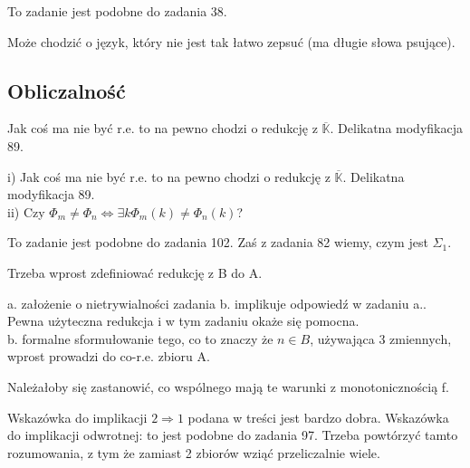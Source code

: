 \documentclass[a4paper,11pt]{article}
\newenvironment{zadanie}[1]
  {\renewcommand\theinnercustomthm{#1}\innercustomthm}
  {\endinnercustomthm}
\begin{document}
\begin{zadanie}{75}
To zadanie jest podobne do zadania 38.
\end{zadanie}

\begin{zadanie}{76}
Może chodzić o język, który nie jest tak łatwo zepsuć (ma długie słowa psujące).
\end{zadanie}

\subsection{Obliczalność}

\begin{zadanie}{92}
Jak coś ma nie być r.e. to na pewno chodzi o redukcję z $\overline{\mathbb{K}}$. Delikatna modyfikacja 89.
\end{zadanie}

\begin{zadanie}{99}
i) Jak coś ma nie być r.e. to na pewno chodzi o redukcję z $\overline{\mathbb{K}}$. Delikatna modyfikacja 89. \\
ii) Czy $\Phi_m \neq \Phi_n \Longleftrightarrow \exists k \Phi_m(k) \neq \Phi_n(k)$?
\end{zadanie}

\begin{zadanie}{100}
To zadanie jest podobne do zadania 102. Zaś z zadania 82 wiemy, czym jest $\Sigma_1$.
\end{zadanie}

\begin{zadanie}{101}
Trzeba wprost zdefiniować redukcję z B do A. 
\end{zadanie}

\begin{zadanie}{102}
a. założenie o nietrywialności zadania b. implikuje odpowiedź w zadaniu a.. Pewna użyteczna redukcja i w tym zadaniu okaże się
pomocna. \\
b. formalne sformułowanie tego, co to znaczy że $n \in B$, używająca 3 zmiennych, wprost prowadzi do co-r.e. zbioru A.
\end{zadanie}

\begin{zadanie}{103}
Należałoby się zastanowić, co wspólnego mają te warunki z monotonicznością f.
\end{zadanie}

\begin{zadanie}{104}
Wskazówka do implikacji $2 \Rightarrow 1$ podana w treści jest bardzo dobra. Wskazówka do implikacji odwrotnej: to jest podobne
do zadania 97. Trzeba powtórzyć tamto rozumowania, z tym że zamiast 2 zbiorów wziąć przeliczalnie wiele.
\end{zadanie}
\end{document}
